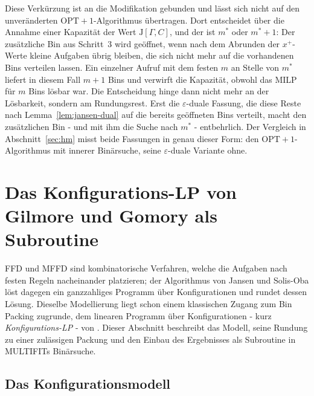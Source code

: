 Diese Verkürzung ist an die Modifikation gebunden und lässt sich nicht auf den unveränderten
$\mathrm{OPT}+1$-Algorithmus übertragen.
Dort entscheidet über die Annahme einer Kapazität der Wert $\mathrm{J}[\Gamma, C]$, und der ist
$m^*$ oder $m^*+1$: Der zusätzliche Bin aus Schritt~3 wird geöffnet, wenn nach dem Abrunden der
$x^+$-Werte kleine Aufgaben übrig bleiben, die sich nicht mehr auf die vorhandenen Bins
verteilen lassen.
Ein einzelner Aufruf mit dem festen $m$ an Stelle von $m^*$ liefert in diesem Fall $m+1$ Bins
und verwirft die Kapazität, obwohl das MILP für $m$ Bins lösbar war.
Die Entscheidung hinge dann nicht mehr an der Lösbarkeit, sondern am Rundungsrest.
Erst die $\varepsilon$-duale Fassung, die diese Reste nach Lemma~\ref{lem:jansen-dual} auf die
bereits geöffneten Bins verteilt, macht den zusätzlichen Bin - und mit ihm die Suche nach
$m^*$ - entbehrlich.
Der Vergleich in Abschnitt~\ref{sec:hm} misst beide Fassungen in genau dieser Form: den
$\mathrm{OPT}+1$-Algorithmus mit innerer Binärsuche, seine $\varepsilon$-duale Variante ohne.

\section{Das Konfigurations-LP von Gilmore und Gomory als Subroutine}
\label{sec:gg-lp}

FFD und MFFD sind kombinatorische Verfahren, welche die Aufgaben nach festen Regeln
nacheinander platzieren; der Algorithmus von Jansen und Solis-Oba
löst dagegen ein ganzzahliges Programm über Konfigurationen und rundet dessen Lösung.
Dieselbe Modellierung liegt schon einem klassischen Zugang zum Bin Packing zugrunde, dem linearen
Programm über Konfigurationen - kurz \emph{Konfigurations-LP} - von
\textcite{gilmore_gomory1961,gilmore_gomory1963}.
Dieser Abschnitt beschreibt das Modell, seine Rundung zu einer zulässigen Packung und
den Einbau des Ergebnisses als Subroutine in MULTIFITs Binärsuche.

\subsection{Das Konfigurationsmodell}
\label{sub:gg-modell}

